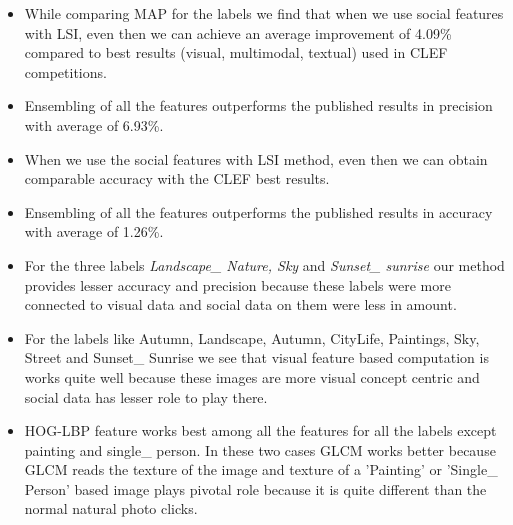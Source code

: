 \begin{itemize}

\item While comparing MAP for the labels we find that when we use social features with LSI, even then we can  achieve an average improvement of 4.09\% compared to best results (visual, multimodal, textual) used in CLEF competitions.

\item Ensembling of all the features outperforms the published results in precision with average of 6.93\%.

\item When we use the social features with LSI method, even then we can obtain comparable accuracy with the CLEF best results.

\item Ensembling of all the features outperforms the published results in accuracy with average of 1.26\%.

\item For the three labels \textit{Landscape\_ Nature, Sky} and \textit{Sunset\_ sunrise} our method provides lesser accuracy and precision because these labels were more connected to visual data and social data on them were less in amount.

\item For the labels like Autumn, Landscape, Autumn, CityLife, Paintings, Sky, Street and Sunset\_ Sunrise we see that visual feature based computation is works quite well because these images are more visual concept centric and social data has lesser role to play there.

\item HOG-LBP feature works best among all the features for all the labels except painting and single\_ person. In these two cases GLCM works better because GLCM reads the texture of the image and texture of a 'Painting' or 'Single\_ Person' based image plays pivotal role because it is quite different than the normal natural photo clicks.

\end{itemize}

\newpage

